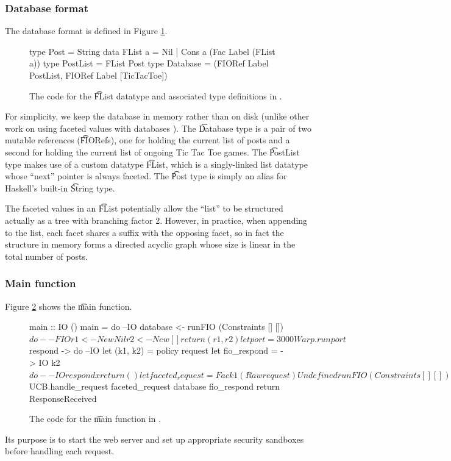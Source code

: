 \begin{refsection}
\subsubsection{Database format}

The database format is defined in Figure \ref{code_flist}.
\begin{figure}
\begin{fb}
type Post     = String
data FList a  = Nil
              | Cons a (Fac Label (FList a))
type PostList = FList Post
type Database = (FIORef Label PostList, FIORef Label [TicTacToe])
\end{fb}
\caption{The code for the \t{FList} datatype and associated type definitions in \viF{}.}
\label{code_flist}
\end{figure}
For simplicity, we keep the database in memory rather than on disk
(unlike other work on using faceted values with databases \cite{yang2016precise,alpernas2018secure}).
%
The \t{Database} type is a pair of two mutable references (\t{FIORef}s),
one for holding the current list of posts and a second for holding the current list of ongoing Tic Tac Toe games.
%
The \t{PostList} type makes use of a custom datatype \t{FList},
which is a singly-linked list datatype whose ``next'' pointer is always faceted.
%
The \t{Post} type is simply an alias for Haskell's built-in \t{String} type.

The faceted values in an \t{FList} potentially allow the ``list'' to be structured actually as a tree with branching factor 2.
%
However, in practice, when appending to the list,
each facet shares a suffix with the opposing facet,
so in fact the structure in memory forms a directed acyclic graph whose size is linear in the total number of posts.

\subsubsection{Main function}

Figure \ref{code_main} shows the \t{main} function.
\begin{figure}
\begin{fb}
main :: IO ()
main = do  --IO
  database <- runFIO (Constraints [] []) $ do  --FIO
    r1 <- New Nil
    r2 <- New []
    return (r1, r2)
  let port = 3000
  Warp.run port $ \request respond -> do  --IO
    let (k1, k2) = policy request
    let fio_respond = \x -> IO k2 $ do  --IO
         respond x
         return ()
    let faceted_request = Fac k1 (Raw request) Undefined
    runFIO (Constraints [] []) $
        UCB.handle_request faceted_request database fio_respond
    return ResponseReceived
\end{fb}
\caption{The code for the \t{main} function in \viF{}.}
\label{code_main}
\end{figure}
Its purpose is to start the web server and set up appropriate security sandboxes before handling each request.


\end{refsection}
